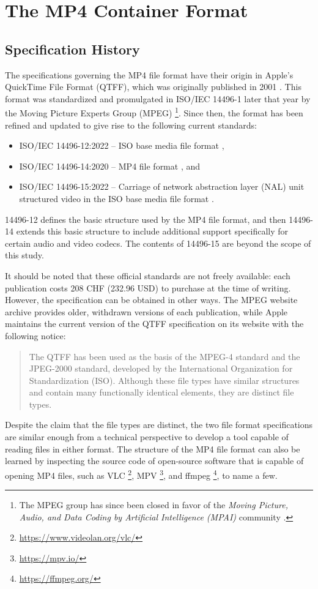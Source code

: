 \section{The MP4 Container Format}

\subsection{Specification History}

The specifications governing the MP4 file format have their origin in Apple's QuickTime File Format (QTFF), which was originally published in 2001 \cite{apple2001}. This format was standardized and promulgated in ISO/IEC 14496-1 \cite{iso14496-1:2001} later that year by the Moving Picture Experts Group (MPEG) \cite{mpeg}\footnote{The MPEG group has since been closed in favor of the \emph{Moving Picture, Audio, and Data Coding by Artificial Intelligence (MPAI)} community \cite{mpai}.}. Since then, the format has been refined and updated to give rise to the following current standards:
\begin{itemize}
	\item ISO/IEC 14496-12:2022 -- ISO base media file format \cite{iso14496-12:2022},
	\item ISO/IEC 14496-14:2020 -- MP4 file format \cite{iso14496-14:2020}, and
	\item ISO/IEC 14496-15:2022 -- Carriage of network abstraction layer (NAL) unit structured video in the ISO base media file format \cite{iso14496-15:2022}.
\end{itemize}
14496-12 defines the basic structure used by the MP4 file format, and then 14496-14 extends this basic structure to include additional support specifically for certain audio and video codecs. The contents of 14496-15 are beyond the scope of this study.

It should be noted that these official standards are not freely available: each publication costs 208 CHF (232.96 USD) to purchase at the time of writing. However, the specification can be obtained in other ways. The MPEG website archive \cite{mpeg} provides older, withdrawn versions of each publication, while Apple maintains the current version of the QTFF specification on its website with the following notice:
\begin{quote}
	The QTFF has been used as the basis of the MPEG-4 standard and the JPEG-2000 standard, developed by the International Organization for Standardization (ISO). Although these file types have similar structures and contain many functionally identical elements, they are distinct file types. \cite{apple2016}
\end{quote}
Despite the claim that the file types are distinct, the two file format specifications are similar enough from a technical perspective to develop a tool capable of reading files in either format. The structure of the MP4 file format can also be learned by inspecting the source code of open-source software that is capable of opening MP4 files, such as VLC \footnote{\url{https://www.videolan.org/vlc/}}, MPV \footnote{\url{https://mpv.io/}}, and ffmpeg \footnote{\url{https://ffmpeg.org/}}, to name a few.

